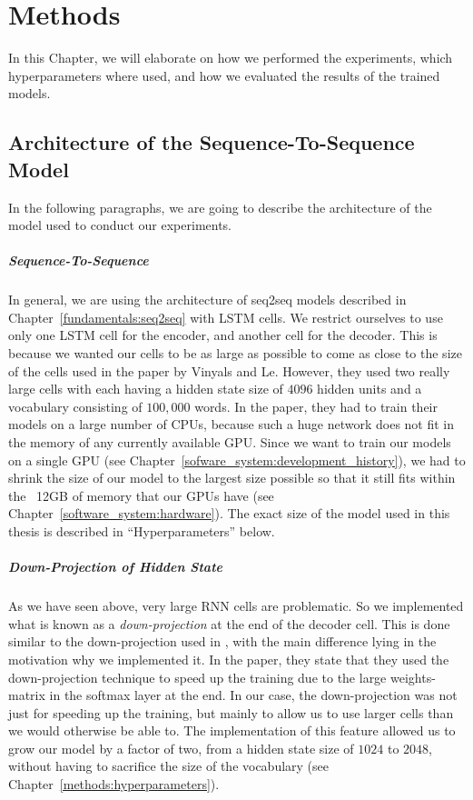 \chapter{Methods}
\label{methods}
In this Chapter, we will elaborate on how we performed the experiments, which hyperparameters where used, and how we evaluated the results of the trained models.

\section{Architecture of the Sequence-To-Sequence Model}
\label{methods:architecture}
In the following paragraphs, we are going to describe the architecture of the model used to conduct our experiments.

\paragraph{Sequence-To-Sequence} In general, we are using the architecture of seq2seq models described in Chapter~\ref{fundamentals:seq2seq} with LSTM cells. We restrict ourselves to use only one LSTM cell for the encoder, and another cell for the decoder. This is because we wanted our cells to be as large as possible to come as close to the size of the cells used in the paper by Vinyals and Le\cite{Vinyals:2015}. However, they used two really large cells with each having a hidden state size of $4096$ hidden units and a vocabulary consisting of $100,000$ words. In the paper, they had to train their models on a large number of CPUs, because such a huge network does not fit in the memory of any currently available GPU. Since we want to train our models on a single GPU (see Chapter~\ref{sofware_system:development_history}), we had to shrink the size of our model to the largest size possible so that it still fits within the ~12GB of memory that our GPUs have (see Chapter~\ref{software_system:hardware}). The exact size of the model used in this thesis is described in ``Hyperparameters'' below.

\paragraph{Down-Projection of Hidden State} As we have seen above, very large RNN cells are problematic. So we implemented what is known as a \emph{down-projection} at the end of the decoder cell. This is done similar to the down-projection used in \cite{Vinyals:2015}, with the main difference lying in the motivation why we implemented it. In the paper, they state that they used the down-projection technique to speed up the training due to the large weights-matrix in the softmax layer at the end. In our case, the down-projection was not just for speeding up the training, but mainly to allow us to use larger cells than we would otherwise be able to. The implementation of this feature allowed us to grow our model by a factor of two, from a hidden state size of $1024$ to $2048$, without having to sacrifice the size of the vocabulary (see Chapter~\ref{methods:hyperparameters}).

